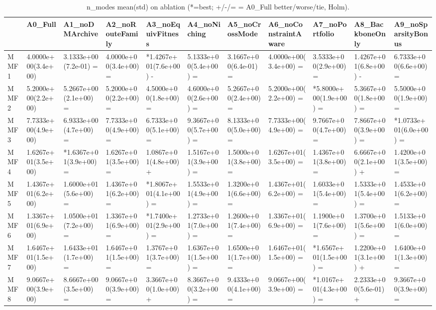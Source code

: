 \begin{table}[t]
\centering
\caption{n_modes mean(std) on ablation (*=best; +/-/= = A0_Full better/worse/tie, Holm).}
\label{tab:ablation_n_modes}
\begin{tabular}{lllllllllll}
\toprule
 & A0\_Full & A1\_noDMArchive & A2\_noRouteFamily & A3\_noEquivFitness & A4\_noNiching & A5\_noCrossMode & A6\_noConstraintAware & A7\_noPortfolio & A8\_BackboneOnly & A9\_noSparsityBonus \\
\midrule
MMF1 & 4.0000e+00(3.4e+00) & 3.1333e+00(7.2e-01) = & 4.0000e+00(3.4e+00) = & *1.4267e+01(7.6e+00) - & 5.1333e+00(5.4e+00) = & 3.1667e+00(6.4e-01) = & 4.0000e+00(3.4e+00) = & 3.5333e+00(2.9e+00) = & 1.4267e+01(6.8e+00) - & 6.7333e+00(6.6e+00) = \\
MMF2 & 5.2000e+00(2.2e+00) & 5.2667e+00(2.1e+00) = & 5.2000e+00(2.2e+00) = & 4.5000e+00(1.8e+00) = & 4.6000e+00(2.6e+00) = & 5.2667e+00(2.4e+00) = & 5.2000e+00(2.2e+00) = & *5.8000e+00(1.9e+00) = & 5.3667e+00(1.8e+00) = & 5.5000e+00(1.9e+00) = \\
MMF3 & 7.7333e+00(4.9e+00) & 6.9333e+00(4.7e+00) = & 7.7333e+00(4.9e+00) = & 6.7333e+00(5.1e+00) = & 9.3667e+00(5.7e+00) = & 8.1333e+00(5.0e+00) = & 7.7333e+00(4.9e+00) = & 9.7667e+00(4.7e+00) = & 7.8667e+00(3.9e+00) = & *1.0733e+01(6.0e+00) = \\
MMF4 & 1.6267e+01(3.5e+00) & *1.6367e+01(3.9e+00) = & 1.6267e+01(3.5e+00) = & 1.0867e+01(4.8e+00) + & 1.5167e+01(3.9e+00) = & 1.5000e+01(3.8e+00) = & 1.6267e+01(3.5e+00) = & 1.4367e+01(3.8e+00) = & 6.6667e+00(2.1e+00) + & 1.4200e+01(3.5e+00) = \\
MMF5 & 1.4367e+01(6.2e+00) & 1.6000e+01(5.6e+00) = & 1.4367e+01(6.2e+00) = & *1.8067e+01(4.1e+00) = & 1.5533e+01(4.9e+00) = & 1.3200e+01(6.6e+00) = & 1.4367e+01(6.2e+00) = & 1.6033e+01(5.4e+00) = & 1.5333e+01(5.4e+00) = & 1.4533e+01(6.2e+00) = \\
MMF6 & 1.3367e+01(6.9e+00) & 1.0500e+01(7.2e+00) = & 1.3367e+01(6.9e+00) = & *1.7400e+01(2.9e+00) = & 1.2733e+01(7.0e+00) = & 1.2600e+01(7.4e+00) = & 1.3367e+01(6.9e+00) = & 1.1900e+01(7.6e+00) = & 1.3700e+01(5.6e+00) = & 1.5133e+01(6.0e+00) = \\
MMF7 & 1.6467e+01(1.5e+00) & 1.6433e+01(1.7e+00) = & 1.6467e+01(1.5e+00) = & 1.3767e+01(3.7e+00) = & 1.6367e+01(1.5e+00) = & 1.6500e+01(1.7e+00) = & 1.6467e+01(1.5e+00) = & *1.6567e+01(1.5e+00) = & 1.2200e+01(3.1e+00) + & 1.6400e+01(1.3e+00) = \\
MMF8 & 9.0667e+00(3.9e+00) & 8.6667e+00(3.5e+00) = & 9.0667e+00(3.9e+00) = & 3.3667e+00(1.0e+00) + & 8.3667e+00(3.2e+00) = & 9.4333e+00(4.1e+00) = & 9.0667e+00(3.9e+00) = & *1.0167e+01(4.3e+00) = & 2.2333e+00(5.6e-01) + & 9.3667e+00(3.9e+00) = \\
\bottomrule
\end{tabular}
\end{table}
